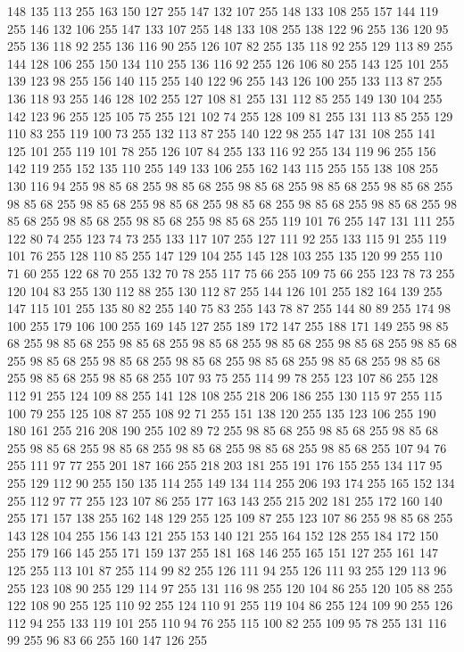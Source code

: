 148 135 113 255 163 150 127 255 147 132 107 255 148 133 108 255 157 144 119 255 146 132 106 255 147 133 107 255 148 133 108 255 138 122 96 255 136 120 95 255 136 118 92 255 136 116 90 255 126 107 82 255 135 118 92 255 129 113 89 255 144 128 106 255 150 134 110 255 136 116 92 255 126 106 80 255 143 125 101 255 139 123 98 255 156 140 115 255 140 122 96 255 143 126 100 255 133 113 87 255 136 118 93 255 146 128 102 255 127 108 81 255 131 112 85 255 149 130 104 255 142 123 96 255 125 105 75 255 121 102 74 255 128 109 81 255 131 113 85 255 129 110 83 255 119 100 73 255 132 113 87 255 140 122 98 255 147 131 108 255 141 125 101 255 119 101 78 255 126 107 84 255 133 116 92 255 134 119 96 255 156 142 119 255 152 135 110 255 149 133 106 255 162 143 115 255 155 138 108 255 130 116 94 255 98 85 68 255 98 85 68 255 98 85 68 255 98 85 68 255 98 85 68 255 98 85 68 255 98 85 68 255 98 85 68 255 98 85 68 255 98 85 68 255 98 85 68 255 98 85 68 255 98 85 68 255
98 85 68 255 98 85 68 255 119 101 76 255 147 131 111 255 122 80 74 255 123 74 73 255 133 117 107 255 127 111 92 255 133 115 91 255 119 101 76 255 128 110 85 255 147 129 104 255 145 128 103 255 135 120 99 255 110 71 60 255 122 68 70 255 132 70 78 255 117 75 66 255 109 75 66 255 123 78 73 255 120 104 83 255 130 112 88 255 130 112 87 255 144 126 101 255 182 164 139 255 147 115 101 255 135 80 82 255 140 75 83 255 143 78 87 255 144 80 89 255 174 98 100 255 179 106 100 255 169 145 127 255 189 172 147 255 188 171 149 255 98 85 68 255 98 85 68 255 98 85 68 255 98 85 68 255 98 85 68 255 98 85 68 255 98 85 68 255 98 85 68 255 98 85 68 255 98 85 68 255 98 85 68 255 98 85 68 255 98 85 68 255 98 85 68 255 98 85 68 255 107 93 75 255 114 99 78 255 123 107 86 255 128 112 91 255 124 109 88 255 141 128 108 255 218 206 186 255 130 115 97 255 115 100 79 255 125 108 87 255 108 92 71 255 151 138 120 255 135 123 106 255 190 180 161 255
216 208 190 255 102 89 72 255 98 85 68 255 98 85 68 255 98 85 68 255 98 85 68 255 98 85 68 255 98 85 68 255 98 85 68 255 98 85 68 255 107 94 76 255 111 97 77 255 201 187 166 255 218 203 181 255 191 176 155 255 134 117 95 255 129 112 90 255 150 135 114 255 149 134 114 255 206 193 174 255 165 152 134 255 112 97 77 255 123 107 86 255 177 163 143 255 215 202 181 255 172 160 140 255 171 157 138 255 162 148 129 255 125 109 87 255 123 107 86 255 98 85 68 255 143 128 104 255 156 143 121 255 153 140 121 255 164 152 128 255 184 172 150 255 179 166 145 255 171 159 137 255 181 168 146 255 165 151 127 255 161 147 125 255 113 101 87 255 114 99 82 255 126 111 94 255 126 111 93 255 129 113 96 255 123 108 90 255 129 114 97 255 131 116 98 255 120 104 86 255 120 105 88 255 122 108 90 255 125 110 92 255 124 110 91 255 119 104 86 255 124 109 90 255 126 112 94 255 133 119 101 255 110 94 76 255 115 100 82 255 109 95 78 255 131 116 99 255 96 83 66 255 160 147 126 255
